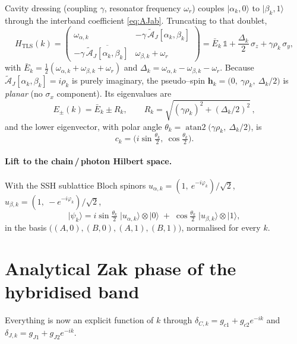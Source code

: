 \documentclass[11pt]{article}
\newcommand{\dC}{\delta_{C,k}}
\newcommand{\dJ}{\delta_{J,k}}
\newcommand{\ph}{\varphi_k}
\newcommand{\oa}{\omega_{\alpha,k}}
\newcommand{\ob}{\omega_{\beta,k}}
\newcommand{\AJ}{\tilde{\mathcal{A}}_J}
\newcommand{\ket}[1]{\lvert #1 \rangle}
\newcommand{\atantwo}{\operatorname{atan2}}
\begin{document}
Cavity dressing (coupling $\gamma$, resonator frequency $\omega_r$) couples
$\ket{\alpha_k,0}$ to $\ket{\beta_k,1}$ through the interband coefficient
\eqref{eq:AJab}. Truncating to that doublet,
\begin{equation}\label{eq:HTLS}
  H_{\mathrm{TLS}}(k)=
  \begin{pmatrix}
    \oa & -\gamma\,\AJ[\alpha_k,\beta_k]\\[2pt]
    -\gamma\,\overline{\AJ[\alpha_k,\beta_k]} & \ob+\omega_r
  \end{pmatrix}
  = \bar E_k\,\mathbb 1 + \frac{\Delta_k}{2}\,\sigma_z + \gamma\rho_k\,\sigma_y,
\end{equation}
with $\bar E_k=\tfrac12(\oa+\ob+\omega_r)$ and $\Delta_k=\oa-\ob-\omega_r$.
Because $\AJ[\alpha_k,\beta_k]=i\rho_k$ is purely imaginary, the pseudo--spin
$\bm h_k=\bigl(0,\ \gamma\rho_k,\ \Delta_k/2\bigr)$ is \emph{planar}
(no $\sigma_x$ component). Its eigenvalues are
\begin{equation}
  E_{\pm}(k)=\bar E_k\pm R_k,
  \qquad
  R_k=\sqrt{(\gamma\rho_k)^{2}+(\Delta_k/2)^{2}}\,,
\end{equation}
and the lower eigenvector, with polar angle
$\theta_k=\atantwo\!\bigl(\gamma\rho_k,\ \Delta_k/2\bigr)$, is
\begin{equation}\label{eq:cspinor}
  c_k=\bigl(i\sin\tfrac{\theta_k}{2},\ \cos\tfrac{\theta_k}{2}\bigr).
\end{equation}

\paragraph{Lift to the chain\,/\,photon Hilbert space.}
With the SSH sublattice Bloch spinors
$u_{\alpha,k}=(1,\ e^{-i\ph})/\sqrt2$, $u_{\beta,k}=(1,\ -e^{-i\ph})/\sqrt2$,
\begin{equation}\label{eq:psik}
  \ket{\psi_k}
   = i\sin\tfrac{\theta_k}{2}\;\ket{u_{\alpha,k}}\otimes\ket{0}
   \;+\;\cos\tfrac{\theta_k}{2}\;\ket{u_{\beta,k}}\otimes\ket{1},
\end{equation}
in the basis $\bigl((A,0),(B,0),(A,1),(B,1)\bigr)$, normalised for every $k$.

\section{Analytical Zak phase of the hybridised band}\label{sec:zak}

Everything is now an explicit function of $k$ through
$\dC=g_{c1}+g_{c2}e^{-ik}$ and $\dJ=g_{J1}+g_{J2}e^{-ik}$.
\end{document}
